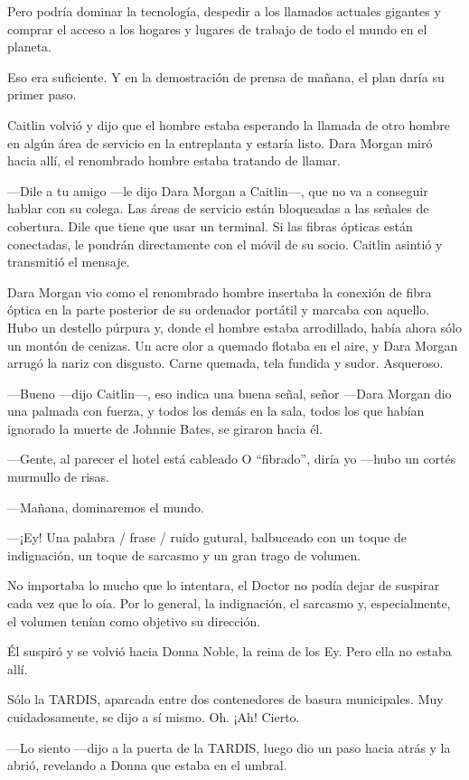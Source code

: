 Pero podría dominar la tecnología, despedir a los llamados actuales
gigantes y comprar el acceso a los hogares y lugares de trabajo de todo
el mundo en el planeta.

Eso era suficiente. Y en la demostración de prensa de mañana, el plan
daría su primer paso.

Caitlin volvió y dijo que el hombre estaba esperando la llamada de otro
hombre en algún área de servicio en la entreplanta y estaría listo. Dara
Morgan miró hacia allí, el renombrado hombre estaba tratando de llamar.

---Dile a tu amigo ---le dijo Dara Morgan a Caitlin---, que no va a
conseguir hablar con su colega. Las áreas de servicio están bloqueadas a
las señales de cobertura. Dile que tiene que usar un terminal. Si las
fibras ópticas están conectadas, le pondrán directamente con el móvil de
su socio. Caitlin asintió y transmitió el mensaje.

Dara Morgan vio como el renombrado hombre insertaba la conexión de fibra
óptica en la parte posterior de su ordenador portátil y marcaba con
aquello. Hubo un destello púrpura y, donde el hombre estaba arrodillado,
había ahora sólo un montón de cenizas. Un acre olor a quemado flotaba en
el aire, y Dara Morgan arrugó la nariz con disgusto. Carne quemada,
tela fundida y sudor. Asqueroso.

---Bueno ---dijo Caitlin---, eso indica una buena señal, señor ---Dara
Morgan dio una palmada con fuerza, y todos los demás en la sala, todos
los que habían ignorado la muerte de Johnnie Bates, se giraron hacia él.

---Gente, al parecer el hotel está cableado O ``fibrado'', diría yo
---hubo un cortés murmullo de risas.

---Mañana, dominaremos el mundo.

---¡Ey! Una palabra / frase / ruido gutural, balbuceado con un toque de
indignación, un toque de sarcasmo y un gran trago de volumen.

No importaba lo mucho que lo intentara, el Doctor no podía dejar de
suspirar cada vez que lo oía. Por lo general, la indignación, el
sarcasmo y, especialmente, el volumen tenían como objetivo su dirección.

Él suspiró y se volvió hacia Donna Noble, la reina de los Ey. Pero ella
no estaba allí.

Sólo la TARDIS, aparcada entre dos contenedores de basura municipales.
Muy cuidadosamente, se dijo a sí mismo. Oh. ¡Ah! Cierto.

---Lo siento ---dijo a la puerta de la TARDIS, luego dio un paso hacia
atrás y la abrió, revelando a Donna que estaba en el umbral.


